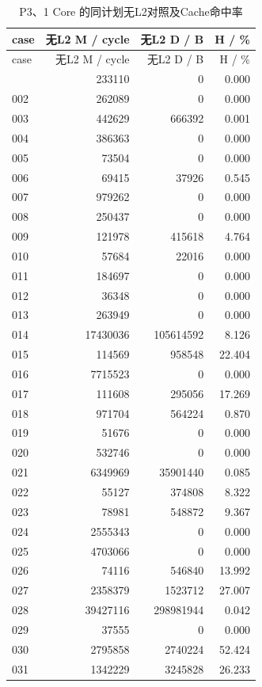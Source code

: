\documentclass[anonymous,notoc]{gmcm2026}
\begin{document}
\begin{longtable}{lrrr}
\caption{P3、1 Core 的同计划无L2对照及Cache命中率}\\
\toprule
case & 无L2 M / cycle & 无L2 D / B & H / \%\\\midrule
\endfirsthead
\toprule
case & 无L2 M / cycle & 无L2 D / B & H / \%\\\midrule
\endhead
\bottomrule\endfoot
001 & 233110 & 0 & 0.000 \\
002 & 262089 & 0 & 0.000 \\
003 & 442629 & 666392 & 0.001 \\
004 & 386363 & 0 & 0.000 \\
005 & 73504 & 0 & 0.000 \\
006 & 69415 & 37926 & 0.545 \\
007 & 979262 & 0 & 0.000 \\
008 & 250437 & 0 & 0.000 \\
009 & 121978 & 415618 & 4.764 \\
010 & 57684 & 22016 & 0.000 \\
011 & 184697 & 0 & 0.000 \\
012 & 36348 & 0 & 0.000 \\
013 & 263949 & 0 & 0.000 \\
014 & 17430036 & 105614592 & 8.126 \\
015 & 114569 & 958548 & 22.404 \\
016 & 7715523 & 0 & 0.000 \\
017 & 111608 & 295056 & 17.269 \\
018 & 971704 & 564224 & 0.870 \\
019 & 51676 & 0 & 0.000 \\
020 & 532746 & 0 & 0.000 \\
021 & 6349969 & 35901440 & 0.085 \\
022 & 55127 & 374808 & 8.322 \\
023 & 78981 & 548872 & 9.367 \\
024 & 2555343 & 0 & 0.000 \\
025 & 4703066 & 0 & 0.000 \\
026 & 74116 & 546840 & 13.992 \\
027 & 2358379 & 1523712 & 27.007 \\
028 & 39427116 & 298981944 & 0.042 \\
029 & 37555 & 0 & 0.000 \\
030 & 2795858 & 2740224 & 52.424 \\
031 & 1342229 & 3245828 & 26.233 \\

\end{longtable}
\end{document}
